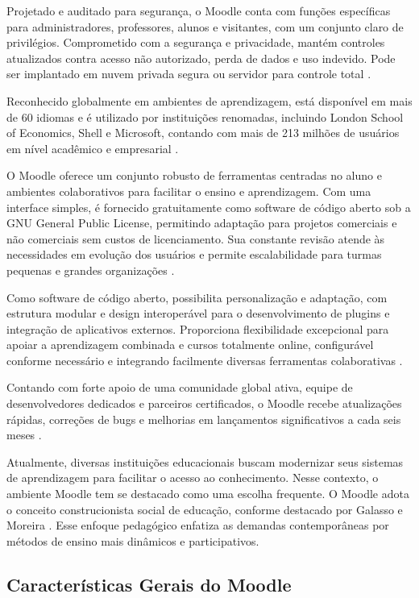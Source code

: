 Projetado e auditado para segurança, o Moodle conta com funções específicas para administradores, professores, alunos e visitantes, com um conjunto claro de privilégios. Comprometido com a segurança e privacidade, mantém controles atualizados contra acesso não autorizado, perda de dados e uso indevido. Pode ser implantado em nuvem privada segura ou servidor para controle total \cite{moodle}. 

Reconhecido globalmente em ambientes de aprendizagem, está disponível em mais de 60 idiomas e é utilizado por instituições renomadas, incluindo London School of Economics, Shell e Microsoft, contando com mais de 213 milhões de usuários em nível acadêmico e empresarial \cite{moodle}. 

O Moodle oferece um conjunto robusto de ferramentas centradas no aluno e ambientes colaborativos para facilitar o ensino e aprendizagem. Com uma interface simples, é fornecido gratuitamente como software de código aberto sob a GNU General Public License, permitindo adaptação para projetos comerciais e não comerciais sem custos de licenciamento. Sua constante revisão atende às necessidades em evolução dos usuários e permite escalabilidade para turmas pequenas e grandes organizações \cite{moodle}. 

Como software de código aberto, possibilita personalização e adaptação, com estrutura modular e design interoperável para o desenvolvimento de plugins e integração de aplicativos externos. Proporciona flexibilidade excepcional para apoiar a aprendizagem combinada e cursos totalmente online, configurável conforme necessário e integrando facilmente diversas ferramentas colaborativas \cite{moodle}. 

Contando com forte apoio de uma comunidade global ativa, equipe de desenvolvedores dedicados e parceiros certificados, o Moodle recebe atualizações rápidas, correções de bugs e melhorias em lançamentos significativos a cada seis meses \cite{moodle}.

Atualmente, diversas instituições educacionais buscam modernizar seus sistemas de aprendizagem para facilitar o acesso ao conhecimento. Nesse contexto, o ambiente Moodle tem se destacado como uma escolha frequente. O Moodle adota o conceito construcionista social de educação, conforme destacado por Galasso e Moreira \cite[p.~22]{galasso}. Esse enfoque pedagógico enfatiza as demandas contemporâneas por métodos de ensino mais dinâmicos e participativos.

\subsection{\textbf{Características Gerais do Moodle}}

